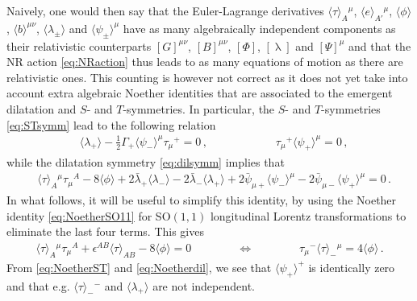 \documentclass[a4paper,10pt,openany]{article}
\begin{document}
	Naively, one would then say that the Euler-Lagrange derivatives $\langle \tau \rangle_A{}^\mu$, $\langle e \rangle_{A'}{}^\mu$, $\langle \phi \rangle$, $\langle b \rangle^{\mu\nu}$, $\langle \lambda_\pm \rangle$ and $\langle \psi_\pm \rangle^\mu$ have as many algebraically independent components as their relativistic counterparts $[G]^{\mu\nu}$, $[B]^{\mu\nu}$, $[\Phi]$, $[\uplambda]$ and $[\Psi]^\mu$ and that the NR action \eqref{eq:NRaction} thus leads to as many equations of motion as there are relativistic ones. This counting is however not correct as it does not yet take into account extra algebraic Noether identities that are associated to the emergent dilatation and $S$- and $T$-symmetries. In particular, the $S$- and $T$-symmetries \eqref{eq:STsymm} lead to the following relation
	\begin{align}
		\label{eq:NoetherST}
		&  \langle \lambda_+ \rangle - \frac12 \Gamma_+ \langle \psi_- \rangle^\mu \tau_\mu{}^+ = 0 \,, \qquad \qquad \qquad \tau_\mu{}^+ \langle \psi_+ \rangle^\mu = 0 \,,
	\end{align}
	while the dilatation symmetry \eqref{eq:dilsymm} implies that
	\begin{align}
		\label{eq:Noetherdil1}
		& \langle \tau \rangle_A{}^\mu \tau_\mu{}^A - 8 \langle \phi \rangle + 2 \bar{\lambda}_+ \langle \lambda_- \rangle - 2 \bar{\lambda}_- \langle \lambda_+ \rangle + 2 \bar{\psi}_{\mu +} \langle \psi_- \rangle^\mu - 2 \bar{\psi}_{\mu -} \langle \psi_+ \rangle^\mu = 0 \,.
	\end{align}
	In what follows, it will be useful to simplify this identity, by using the Noether identity \eqref{eq:NoetherSO11} for SO$(1,1)$ longitudinal Lorentz transformations to eliminate the last four terms. This gives
	\begin{align} \label{eq:Noetherdil}
		\langle \tau \rangle_A{}^\mu \tau_\mu{}^A + \epsilon^{AB} \langle \tau \rangle_{AB} - 8 \langle \phi \rangle = 0 \qquad \qquad \Leftrightarrow \qquad \qquad \tau_\mu{}^- \langle \tau \rangle_-{}^\mu = 4 \langle \phi \rangle \,.
	\end{align}
	From \eqref{eq:NoetherST} and \eqref{eq:Noetherdil}, we see that $\langle \psi_+ \rangle^+$ is identically zero and that e.g. $\langle \tau \rangle_-{}^{-}$ and $\langle \lambda_+ \rangle$ are not independent.
	
\end{document}
